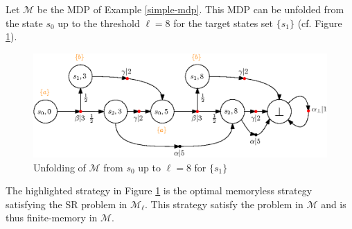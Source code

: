 \begin{example}
  Let $\mathcal{M}$ be the MDP of Example \ref{simple-mdp}.
  This MDP can be unfolded from the state $s_0$ up to the threshold $\ell = 8$ for the target states set $\{s_1\}$ (cf. Figure \ref{unfolding}).
  \begin{figure}[h!]
    \centering
    \includegraphics[width=0.8\linewidth]{resources/unfolding}
    \caption{Unfolding of $\mathcal{M}$ from $s_0$ up to $\ell=8$ for $\{s_1\}$}\label{unfolding}
  \end{figure}
  The highlighted strategy in Figure \ref{unfolding} is the optimal memoryless strategy satisfying the SR problem in $\mathcal{M}_{\ell}$. This strategy satisfy the \SSPP{} problem in $\mathcal{M}$ and is thus finite-memory in $\mathcal{M}$.
\end{example}
